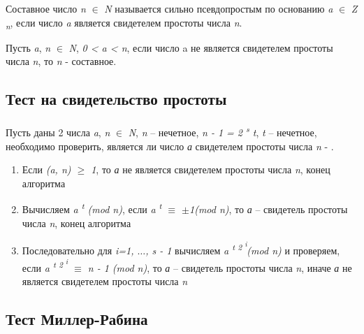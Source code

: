   \begin{definition}    
  
      Составное число \textit{n} {$\in$} \textit{N} называется сильно псевдопростым по основанию \textit{a} 
    {$\in$} \textit{Z\textsubscript{ n}}, если число \textit{a} является свидетелем простоты числа \textit{n}.
    
  \end{definition}

  \begin{statement}   
  
      Пусть \textit{a}, \textit{n} {$\in$} \textit{N}, \textit{0 < a < n}, если число a не является свидетелем 
    простоты числа \textit{n}, то \textit{n} - составное.
    
  \end{statement}

\subsection{Тест на свидетельство простоты}

\paragraph{} Пусть даны 2 числа \textit{a}, \textit{n} {$\in$} \textit{N}, \textit{n} – нечетное, \textit{n - 1 = 2\textsuperscript{ s} t}, 
\textit{t} – нечетное, необходимо проверить, является ли число \textit{а} свидетелем простоты числа \textit{n} - \cite[Глава 5, страницы 169-170]{mah06}.

  \begin{enumerate}
   \item Если \textit{(a, n) {$\ge$} 1}, то \textit{а} не является свидетелем простоты числа \textit{n}, конец алгоритма
   \item Вычисляем \textit{a\textsuperscript{ t} (mod n)}, если \textit{a\textsuperscript{ t} {$\equiv$} {$\pm$}1(mod n)}, то \textit{а}
– свидетель простоты числа \textit{n}, конец алгоритма
   \item Последовательно для \textit{i=1, {$\dots$}, s - 1} вычисляем \textit{a\textsuperscript{ t 2\textsuperscript{ i}}(mod n)} и 
проверяем, если \textit{a\textsuperscript{ t 2\textsuperscript{ i}} {$\equiv$} n - 1 (mod n)}, то \textit{а} – 
свидетель простоты числа \textit{n}, иначе \textit{а} не является свидетелем простоты числа \textit{n}
  \end{enumerate}

  
\subsection{Тест Миллер-Рабина}

